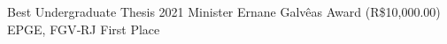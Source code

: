 




\begin{cvhonors}


\cvhonor
{Best Undergraduate Thesis 2021} %
{Minister Ernane Galvêas Award (R\$10,000.00)} %
{EPGE, FGV‑RJ} %
{First Place} %


\end{cvhonors}












